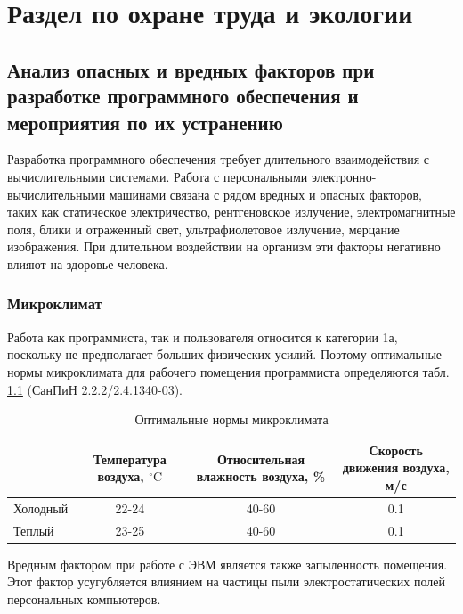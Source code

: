 \chapter{Раздел по охране труда и экологии}
\section{Анализ опасных и вредных факторов при разработке программного обеспечения и мероприятия по их устранению}

Разработка программного обеспечения требует длительного взаимодействия с вычислительными системами. Работа с персональными электронно-вычислительными машинами связана с рядом вредных и опасных факторов, таких как статическое электричество, рентгеновское излучение, электромагнитные поля, блики и отраженный свет, ультрафиолетовое излучение, мерцание изображения. При длительном воздействии на организм эти факторы негативно влияют на здоровье человека.

\subsection{Микроклимат}
Работа как программиста, так и пользователя относится к категории 1а, поскольку не предполагает больших физических усилий. Поэтому оптимальные нормы микроклимата для рабочего помещения программиста определяются табл. \ref{tab:microclimate} (СанПиН 2.2.2/2.4.1340-03).

\begin{table}[ht]
  \center
  \caption{Оптимальные нормы микроклимата}
  \begin{tabular}{|l|c|c|c|}
  \hline
  \multicolumn{1}{|p{0.15\textwidth}|}{}
  & \multicolumn{1}{|p{0.24\textwidth}|}{\centering Температура воздуха, $^\circ\mbox{C}$}
  & \multicolumn{1}{|p{0.31\textwidth}|}{\centering Относительная влажность воздуха, \%}
  & \multicolumn{1}{|p{0.2\textwidth}|}{\centering Скорость движения воздуха, м/с} \\
  \hline                       
  Холодный  & 22-24   & 40-60    & 0.1  \\ 
  \hline
  Теплый    & 23-25   & 40-60    & 0.1  \\ 
  \hline
  \end{tabular}
  \label{tab:microclimate}
\end{table}

Вредным фактором при работе с ЭВМ является также запыленность помещения. Этот фактор усугубляется влиянием на частицы пыли электростатических полей персональных компьютеров.

